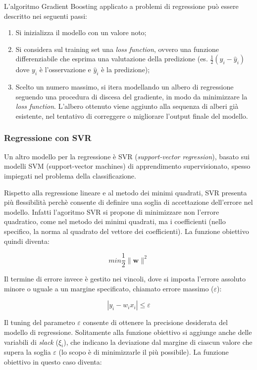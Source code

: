 L’algoritmo Gradient Boosting applicato a problemi di regressione può essere descritto nei seguenti passi:

\begin{enumerate}
  \item Si inizializza il modello con un valore noto;
  \item Si considera sul training set una \textit{loss function}, ovvero una funzione differenziabile che esprima una valutazione della predizione (es. $\frac{1}{2} (y_i - \hat{y}_{i})$ dove $y_i$ è l'osservazione e $\hat{y}_{i}$ è la predizione);
  \item Scelto un numero massimo, si itera modellando un albero di regressione seguendo una procedura di discesa del gradiente, in modo da minimizzare la \textit{loss function}. L'albero ottenuto viene aggiunto alla sequenza di alberi già esistente, nel tentativo di correggere o migliorare l'output finale del modello.
\end{enumerate}


\subsubsection{Regressione con SVR}\label{sssec:regressione-svr}
Un altro modello per la regressione è SVR (\textit{support-vector regression}), basato sui modelli SVM (support-vector machines) di apprendimento supervisionato, spesso impiegati nel problema della classificazione. \cite{svm}

Rispetto alla regressione lineare e al metodo dei minimi quadrati, SVR presenta più flessibilità perchè consente di definire una soglia di accettazione dell'errore nel modello. Infatti l'agoritmo SVR si propone di minimizzare non l'errore quadratico, come nel metodo dei minimi quadrati, ma i coefficienti (nello specifico, la norma al quadrato del vettore dei coefficienti). La funzione obiettivo quindi diventa:

$$min \frac{1}{2}\|\mathbf{w}\|^{2}$$\smallskip

 Il termine di errore invece è gestito nei vincoli, dove si imposta l'errore assoluto minore o uguale a un margine specificato, chiamato errore massimo ($\varepsilon$):
 
 $$\left|y_{i}-w_{i} x_{i}\right| \leq \varepsilon$$\smallskip
 
 Il tuning del parametro $\varepsilon$ consente di ottenere la precisione desiderata del modello di regressione. Solitamente alla funzione obiettivo si aggiunge anche delle variabili di \textit{slack} ($\xi_{i}$), che indicano la deviazione dal margine di ciascun valore che supera la soglia $\varepsilon$ (lo scopo è di minimizzarle il più possibile). La funzione obiettivo in questo caso diventa:
 
